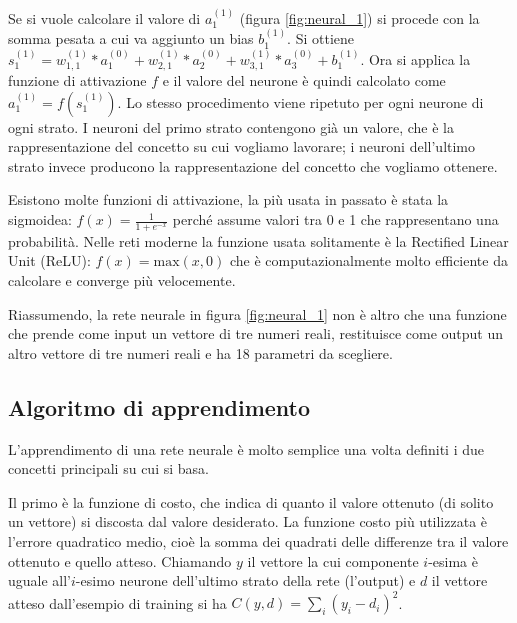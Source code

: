 \documentclass[12pt]{report}
\begin{document}
Se si vuole calcolare il valore di $a_1^{(1)}$ (figura \ref{fig:neural_1}) si procede con la somma pesata a cui va aggiunto un bias $b_1^{(1)}$. Si ottiene $ s_1^{(1)} = w_{1,1}^{(1)} * a_1^{(0)} + w_{2,1}^{(1)} * a_2^{(0)} + w_{3,1}^{(1)} * a_3^{(0)} + b_1^{(1)}$. Ora si applica la funzione di attivazione $f$ e il valore del neurone è quindi calcolato come $a_1^{(1)} = f(s_1^{(1)})$. Lo stesso procedimento viene ripetuto per ogni neurone di ogni strato. I neuroni del primo strato contengono già un valore, che è la rappresentazione del concetto su cui vogliamo lavorare; i neuroni dell'ultimo strato invece producono la rappresentazione del concetto che vogliamo ottenere.

Esistono molte funzioni di attivazione, la più usata in passato è stata la sigmoidea: $f(x) = \frac{1}{1 + e^{-x}}$ perché assume valori tra 0 e 1 che rappresentano una probabilità. Nelle reti moderne la funzione usata solitamente è la Rectified Linear Unit (ReLU): $f(x) = \mbox{max} (x, 0)$ che è computazionalmente molto efficiente da calcolare e converge più velocemente.

Riassumendo, la rete neurale in figura \ref{fig:neural_1} non è altro che una funzione che prende come input un vettore di tre numeri reali, restituisce come output un altro vettore di tre numeri reali e ha 18 parametri da scegliere.

\subsection{Algoritmo di apprendimento}
L'apprendimento di una rete neurale è molto semplice una volta definiti i due concetti principali su cui si basa.

Il primo è la funzione di costo, che indica di quanto il valore ottenuto (di solito un vettore) si discosta dal valore desiderato. La funzione costo più utilizzata è l'errore quadratico medio, cioè la somma dei quadrati delle differenze tra il valore ottenuto e quello atteso. Chiamando $y$ il vettore la cui componente $i$-esima è uguale all'$i$-esimo neurone dell'ultimo strato della rete (l'output) e $d$ il vettore atteso dall'esempio di training si ha $C(y,d) = \sum_{i} (y_i - d_i)^2$.
\end{document}
